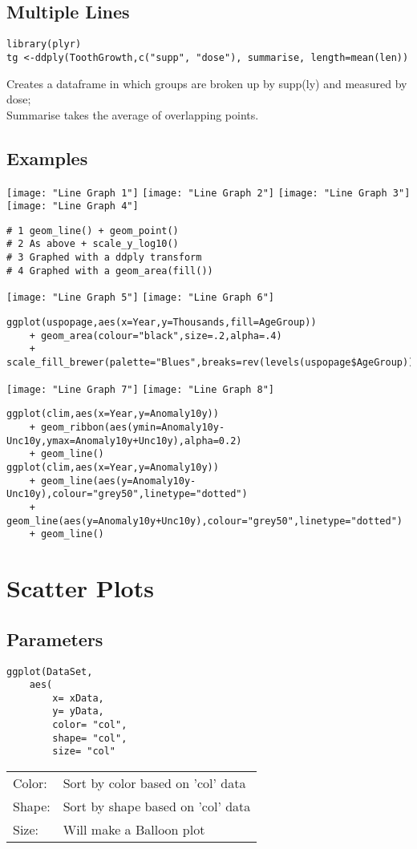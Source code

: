 \documentclass[]{article}
\begin{document}
\subsection{Multiple Lines}
\begin{verbatim}
library(plyr)
tg <-ddply(ToothGrowth,c("supp", "dose"), summarise, length=mean(len))
\end{verbatim}
Creates a dataframe in which groups are broken up by supp(ly) and measured by dose; \\
Summarise takes the average of overlapping points.

\subsection{Examples}
	\texttt{[image: "Line Graph 1"]}
	\texttt{[image: "Line Graph 2"]}
	\texttt{[image: "Line Graph 3"]}
	\texttt{[image: "Line Graph 4"]}
\begin{verbatim}
# 1 geom_line() + geom_point()
# 2 As above + scale_y_log10()
# 3 Graphed with a ddply transform
# 4 Graphed with a geom_area(fill())
\end{verbatim}

	\texttt{[image: "Line Graph 5"]}
	\texttt{[image: "Line Graph 6"]}
\begin{verbatim}
ggplot(uspopage,aes(x=Year,y=Thousands,fill=AgeGroup)) 
	+ geom_area(colour="black",size=.2,alpha=.4) 
	+ scale_fill_brewer(palette="Blues",breaks=rev(levels(uspopage$AgeGroup)))
\end{verbatim}

	\texttt{[image: "Line Graph 7"]}
	\texttt{[image: "Line Graph 8"]}
\begin{verbatim}
ggplot(clim,aes(x=Year,y=Anomaly10y)) 
	+ geom_ribbon(aes(ymin=Anomaly10y-Unc10y,ymax=Anomaly10y+Unc10y),alpha=0.2) 
	+ geom_line()
ggplot(clim,aes(x=Year,y=Anomaly10y)) 
	+ geom_line(aes(y=Anomaly10y-Unc10y),colour="grey50",linetype="dotted") 
	+ geom_line(aes(y=Anomaly10y+Unc10y),colour="grey50",linetype="dotted") 
	+ geom_line()
\end{verbatim}

\section{Scatter Plots}
\subsection{Parameters}
\begin{verbatim}
ggplot(DataSet,
	aes(
		x= xData,
		y= yData,
		color= "col",
		shape= "col",
		size= "col"		
\end{verbatim}
\begin{tabular}{l l}
	Color: & Sort by color based on 'col' data \\
	Shape: & Sort by shape based on 'col' data \\
	Size: & Will make a Balloon plot \\
\end{tabular}
\end{document}
